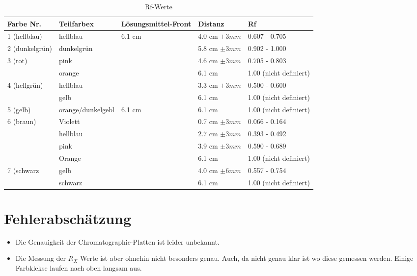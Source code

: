 \documentclass[11pt,paper=a4,final]{scrartcl}
\begin{document}
\begin{savenotes} %
  \begin{table}[ht]
    \centering
    \begin{tabular}{|l|l|l|l|l|}
      \hline
      \bf Farbe Nr.	& \bf Teilfarbex	& \bf L\"osungsmittel-Front	& \bf Distanz		& \bf Rf		\\ \hline
       1 (hellblau)	& hellblau		& \multirow{6}{*}{6.1 cm }
										& 4.0 cm \(\pm 3 mm \)	& 0.607 - 0.705		\\ \cline{1-2} \cline{4-5}
      2 (dunkelgr\"un)	& dunkelgr\"un		&				& 5.8 cm \(\pm 3 mm \)	& 0.902 - 1.000		\\ \cline{1-2} \cline{4-5}
      \multirow{2}{*}{3 (rot) }
			& pink			&				& 4.6 cm \(\pm 3 mm \)	& 0.705 - 0.803		\\ 
			& orange		&				& 6.1 cm 		& 1.00 (nicht definiert)\\ \cline{1-2} \cline{4-5}
      \multirow{2}{*}{4 (hellgr\"un) }
 			& hellblau		&				& 3.3 cm \(\pm 3 mm \)	& 0.500 - 0.600		\\
			& gelb			&				& 6.1 cm		& 1.00 (nicht definiert)\\ \hline
      5 (gelb)		& orange/dunkelgebl	& \multirow{6}{*}{6.1 cm }
										& 6.1 cm		& 1.00 (nicht definiert)\\ \cline{1-2} \cline{4-5}
      \multirow{4}{*}{6 (braun)}
			& Violett		&				& 0.7 cm \(\pm 3 mm \)	& 0.066 - 0.164		\\
			& hellblau		&				& 2.7 cm \(\pm 3 mm \)	& 0.393 - 0.492		\\
      			& pink			&				& 3.9 cm \(\pm 3 mm \)	& 0.590 - 0.689		\\
      			& Orange		&				& 6.1 cm 		& 1.00 (nicht definiert)\\ \cline{1-2} \cline{4-5}
      \multirow{2}{*}{7 (schwarz}
      			& gelb			&				& 4.0 cm \(\pm 6 mm \)	& 0.557 - 0.754		\\
      			& schwarz		&				& 6.1 cm		& 1.00 (nicht definiert)\\ \cline{1-2} \cline{4-5}
      	
    \end{tabular}
    \caption{Rf-Werte}
    \end{table}
\end{savenotes}

\section{Fehlerabsch\"atzung}
\begin{itemize}
  \item Die Genauigkeit der Chromatographie-Platten ist leider unbekannt.
  \item Die Messung der \( R_X \) Werte ist aber ohnehin nicht besonders genau. Auch, da nicht genau klar ist wo diese gemessen werden. Einige Farbklekse laufen nach oben langsam aus.
\end{itemize}
\end{document}
